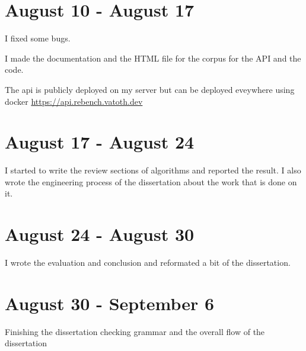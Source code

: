 \documentclass[12pt,a4paper]{article}
\begin{document}
\section{August 10 - August 17}

I fixed some bugs.

I made the documentation and the HTML file for the corpus for the API and the code.

The api is publicly deployed on my server but can be deployed eveywhere using docker
\url{https://api.rebench.vatoth.dev}

\section{August 17 - August 24}

I started to write the review sections of algorithms and reported the result.
I also wrote the engineering process of the dissertation about the work that is done on it.

\section{August 24 - August 30}

I wrote the evaluation and conclusion and reformated a bit of the dissertation.

\section{August 30 - September 6}

Finishing the dissertation checking grammar and the overall flow of the dissertation
\end{document}
